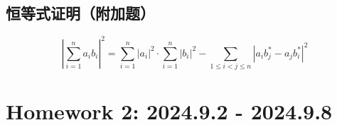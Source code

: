 \documentclass[UTF8]{report}
\theoremstyle{MyLineTheoremStyle} %
\theoremstyle{MyBlockTheoremStyle} %
\theoremstyle{MySubsubsectionStyle} %
\begin{document}
\section{恒等式证明（附加题）}

\begin{equation*}
\left| \sum_{i=1}^{n} a_ib_i \right| ^2 
= \sum_{i=1}^{n} | a_i |^2 \cdot \sum_{i=1}^{n} | b_i |^2 - \sum_{1 \leqslant i <j \leqslant n} \left|  a_ib_j^* - a_jb_i^*  \right|^2  
\end{equation*}



\chapter{Homework 2: 2024.9.2 - 2024.9.8}
\thispagestyle{fancy}
\end{document}
